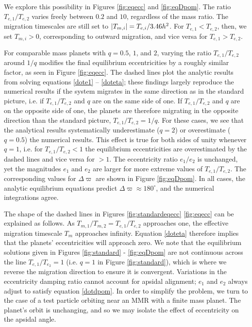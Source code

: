\documentclass[usenatbib,onecolumn]{mnras}
\DeclarePairedDelimiter{\abs}{|}{|}
\begin{document}
We explore this possibility in Figures \ref{fig:eqecc} and
\ref{fig:eqDpom}. The ratio \(T_{e,1}/T_{e,2}\) varies freely between
\(0.2\) and \(10\), regardless of the mass ratio.  The migration
timescales are still set to \(\abs{T_{m,i}}=T_{e,i}/3.46 h^2\).  For
\(T_{e,1}<T_{e,2}\), then, we set \(T_{m,i}>0\), corresponding to outward
migration, and vice versa for \(T_{e,1}>T_{e,2}\).

For comparable mass planets with \(q=0.5\), \(1\), and \(2\), varying the
ratio \(T_{e,1}/T_{e,2}\) around \(1/q\) modifies the final equilibrium
eccentricities by a roughly similar factor, as seen in Figure
\ref{fig:eqecc}.  The dashed lines plot the analytic results from
solving equations \eqref{dote1} -- \eqref{doteta}; these findings largely
reproduce the numerical results if the system migrates in the same
direction as in the standard picture, i.e. if \(T_{e,1}/T_{e,2}\) and
\(q\) are on the same side of one.  If \(T_{e,1}/T_{e,2}\) and \(q\) are on
the opposite side of one, the planets are therefore migrating in the
opposite direction than the standard picture, \(T_{e,1}/T_{e,2}=1/q\).
For these cases, we see that the analytical results systematically
underestimate (\(q=2\)) or overestimate (\(q=0.5\)) the numerical results.
This effect is true for both sides of unity whenever \(q=1\), i.e. for
\(T_{e,1}/T_{e,2}<1\) the equilibrium eccentricities are overestimated
by the dashed lines and vice versa for \(>1\).  The eccentricity ratio
\(e_1/e_2\) is unchanged, yet the magnitudes \(e_1\) and \(e_2\) are larger
for more extreme values of \(T_{e,1}/T_{e,2}\).  The corresponding
values for \(\Delta\varpi\) are shown in Figure \ref{fig:eqDpom}. In all
cases, the analytic equilibrium equations predict \(\Delta\varpi\approx
180^\circ\), and the numerical integrations agree.

The shape of the dashed lines in Figures \ref{fig:standardeqecc}
\ref{fig:eqecc} can be explained as follows.  As
\(T_{m,1}/T_{m,2}=T_{e,1}/T_{e,2}\) approaches one, the effective
migration timescale \(T_m\) approaches infinity.  Equation \eqref{doteta}
therefore implies that the planets' eccentricities will approach zero.
We note that the equilibrium solutions given in Figures
\ref{fig:standard} - \ref{fig:eqDpom} are not continuous across the line
\(T_{e,1}/T_{e_2} = 1\) (i.e. \(q=1\) in Figure \ref{fig:standard}), which
is where we reverse the migration direction to ensure it is
convergent.  Variations in the eccentricity damping ratio cannot
account for apsidal alignment; \(e_1\) and \(e_2\) always adjust to
satisfy equation \eqref{dotdpom}.  In order to simplify the problem, we
turn to the case of a test particle orbiting near an MMR with a finite
mass planet. The planet's orbit is unchanging, and so we may isolate
the effect of eccentricity on the apsidal angle.
\end{document}
